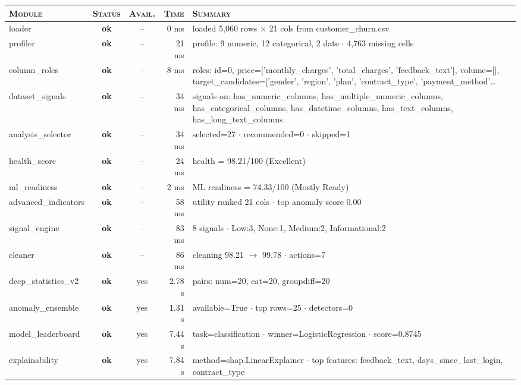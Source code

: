 \documentclass[11pt,a4paper]{article}
\begin{document}
\begin{tabularx}{\linewidth}{l c c r X}
\toprule
\textsc{Module} & \textsc{Status} & \textsc{Avail.} & \textsc{Time} & \textsc{Summary} \\
\midrule
  loader & \textcolor{ok}{\textbf{ok}} & -- & 0 ms & loaded 5,060 rows $\times$ 21 cols from customer\_churn.csv \\
  profiler & \textcolor{ok}{\textbf{ok}} & -- & 21 ms & profile: 9 numeric, 12 categorical, 2 date $\cdot$ 4,763 missing cells \\
  column\_roles & \textcolor{ok}{\textbf{ok}} & -- & 8 ms & roles: id=0, price=['monthly\_charges', 'total\_charges', 'feedback\_text'], volume=[], target\_candidates=['gender', 'region', 'plan', 'contract\_type', 'payment\_method'\ldots{} \\
  dataset\_signals & \textcolor{ok}{\textbf{ok}} & -- & 34 ms & signals on: has\_numeric\_columns, has\_multiple\_numeric\_columns, has\_categorical\_columns, has\_datetime\_columns, has\_text\_columns, has\_long\_text\_columns \\
  analysis\_selector & \textcolor{ok}{\textbf{ok}} & -- & 34 ms & selected=27 $\cdot$ recommended=0 $\cdot$ skipped=1 \\
  health\_score & \textcolor{ok}{\textbf{ok}} & -- & 24 ms & health = 98.21/100 (Excellent) \\
  ml\_readiness & \textcolor{ok}{\textbf{ok}} & -- & 2 ms & ML readiness = 74.33/100 (Mostly Ready) \\
  advanced\_indicators & \textcolor{ok}{\textbf{ok}} & -- & 58 ms & utility ranked 21 cols $\cdot$ top anomaly score 0.00 \\
  signal\_engine & \textcolor{ok}{\textbf{ok}} & -- & 83 ms & 8 signals $\cdot$ Low:3, None:1, Medium:2, Informational:2 \\
  cleaner & \textcolor{ok}{\textbf{ok}} & -- & 86 ms & cleaning 98.21 $\rightarrow$ 99.78 $\cdot$ actions=7 \\
  deep\_statistics\_v2 & \textcolor{ok}{\textbf{ok}} & \textcolor{ok}{yes} & 2.78 s & pairs: num=20, cat=20, groupdiff=20 \\
  anomaly\_ensemble & \textcolor{ok}{\textbf{ok}} & \textcolor{ok}{yes} & 1.31 s & available=True $\cdot$ top rows=25 $\cdot$ detectors=0 \\
  model\_leaderboard & \textcolor{ok}{\textbf{ok}} & \textcolor{ok}{yes} & 7.44 s & task=classification $\cdot$ winner=LogisticRegression $\cdot$ score=0.8745 \\
  explainability & \textcolor{ok}{\textbf{ok}} & \textcolor{ok}{yes} & 7.84 s & method=shap.LinearExplainer $\cdot$ top features: feedback\_text, days\_since\_last\_login, contract\_type \\

\end{tabularx}
\end{document}
